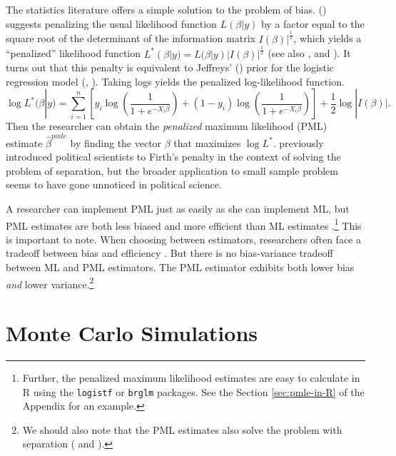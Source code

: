 \documentclass[12pt]{article}
\begin{document}
The statistics literature offers a simple solution to the problem of bias. 
(\citealt{Firth1993}) suggests penalizing the usual likelihood function $L(\beta | y)$ by a factor equal to the square root of the determinant of the information matrix $I(\beta)|^\frac{1}{2}$, which yields a ``penalized'' likelihood function $L^*(\beta | y) = L(\beta | y)|I(\beta)|^\frac{1}{2}$ (see also \citealt{Kosmidis2014}, and \citealt{KosmidisFirth2009}). 
It turns out that this penalty is equivalent to Jeffreys' (\citeyear{Jeffreys1946}) prior for the logistic regression model (\citealt{Firth1993}, \citealt{Poirier1994}).
Taking logs yields the penalized log-likelihood function.
\begin{equation}\nonumber
\log L^*(\beta | y) = \displaystyle \sum_{i = 1}^n \left[y_i \log \left( \dfrac{1}{1 + e^{-X_i\beta}}\right) + (1 - y_i) \log \left( \dfrac{1}{1 + e^{-X_i\beta}}\right)\right] + \dfrac{1}{2} \log |I(\beta)|.
\end{equation}
Then the researcher can obtain the \emph{penalized} maximum likelihood (PML) estimate $\hat{\beta}^{pmle}$ by finding the vector $\beta$ that maximizes $\log L^*$. 
\cite{Zorn2005} previously introduced political scientists to Firth's penalty in the context of solving the problem of separation, but the broader application to small sample problem seems to have gone unnoticed in political science.

A researcher can implement PML just as easily as she can implement ML, but PML estimates are both less biased \citep{Firth1993} and more efficient than ML estimates \citep[p. 49]{Kosmidis2007}.\footnote{Further, the penalized maximum likelihood estimates are easy to calculate in R using the \texttt{logistf} or \texttt{brglm} packages. 
See the Section \ref{sec:pmle-in-R} of the Appendix for an example.}
This is important to note. When choosing between estimators, researchers often face a tradeoff between bias and efficiency \citep[pp. 37-38]{HastieTibshiraniFriedman2013}.
But there is no bias-variance tradeoff between ML and PML estimators.
The PML estimator exhibits both lower bias \textit{and} lower variance.\footnote{We should also note that the PML estimates also solve the problem with separation (\citealt{Zorn2005} and \citealt{Rainey-separation}).}

\section*{Monte Carlo Simulations}
\end{document}
